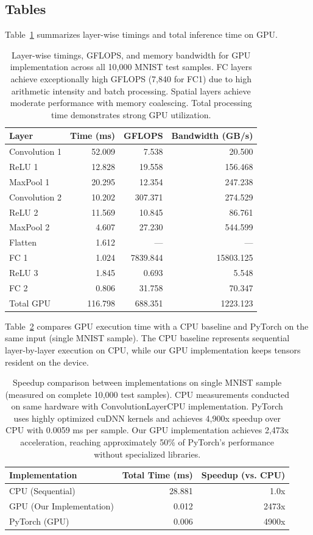 \documentclass[11pt]{article}
\begin{document}
\subsection{Tables}
Table~\ref{tab:timings} summarizes layer-wise timings and total inference time on GPU.

\begin{table}[h]
\centering
\begin{tabular}{lrrr}
\toprule
Layer & Time (ms) & GFLOPS & Bandwidth (GB/s) \\
\midrule
Convolution 1 & 52.009 & 7.538 & 20.500 \\
ReLU 1 & 12.828 & 19.558 & 156.468 \\
MaxPool 1 & 20.295 & 12.354 & 247.238 \\
Convolution 2 & 10.202 & 307.371 & 274.529 \\
ReLU 2 & 11.569 & 10.845 & 86.761 \\
MaxPool 2 & 4.607 & 27.230 & 544.599 \\
Flatten & 1.612 & — & — \\
FC 1 & 1.024 & 7839.844 & 15803.125 \\
ReLU 3 & 1.845 & 0.693 & 5.548 \\
FC 2 & 0.806 & 31.758 & 70.347 \\
\midrule
Total GPU & 116.798 & 688.351 & 1223.123 \\
\bottomrule
\end{tabular}
\caption{Layer-wise timings, GFLOPS, and memory bandwidth for GPU implementation across all 10,000 MNIST test samples. FC layers achieve exceptionally high GFLOPS (7,840 for FC1) due to high arithmetic intensity and batch processing. Spatial layers achieve moderate performance with memory coalescing. Total processing time demonstrates strong GPU utilization.}
\label{tab:timings}
\end{table}

\noindent
Table~\ref{tab:comparison} compares GPU execution time with a CPU baseline and PyTorch on the same input (single MNIST sample). The CPU baseline represents sequential layer-by-layer execution on CPU, while our GPU implementation keeps tensors resident on the device.

\begin{table}[h]
\centering
\begin{tabular}{lrr}
\toprule
Implementation & Total Time (ms) & Speedup (vs. CPU) \\
\midrule
CPU (Sequential) & 28.881 & 1.0x \\
GPU (Our Implementation) & 0.012 & 2473x \\
PyTorch (GPU) & 0.006 & 4900x \\
\bottomrule
\end{tabular}
\caption{Speedup comparison between implementations on single MNIST sample (measured on complete 10,000 test samples). CPU measurements conducted on same hardware with ConvolutionLayerCPU implementation. PyTorch uses highly optimized cuDNN kernels and achieves 4,900x speedup over CPU with 0.0059 ms per sample. Our GPU implementation achieves 2,473x acceleration, reaching approximately 50\% of PyTorch's performance without specialized libraries.}
\label{tab:comparison}
\end{table}
\end{document}
